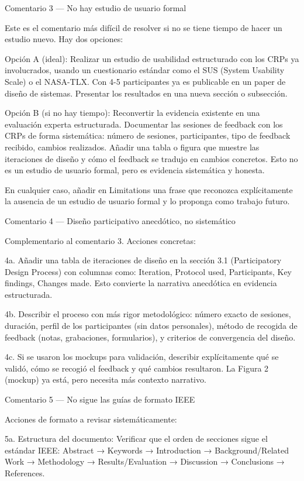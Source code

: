 Comentario 3 — No hay estudio de usuario formal

Este es el comentario más difícil de resolver si no se tiene tiempo de hacer un estudio nuevo. Hay dos opciones:

Opción A (ideal): Realizar un estudio de usabilidad estructurado con los CRPs ya involucrados, usando un cuestionario estándar como el SUS (System Usability Scale) o el NASA-TLX. Con 4-5 participantes ya es publicable en un paper de diseño de sistemas. Presentar los resultados en una nueva sección o subsección.

Opción B (si no hay tiempo): Reconvertir la evidencia existente en una evaluación experta estructurada. Documentar las sesiones de feedback con los CRPs de forma sistemática: número de sesiones, participantes, tipo de feedback recibido, cambios realizados. Añadir una tabla o figura que muestre las iteraciones de diseño y cómo el feedback se tradujo en cambios concretos. Esto no es un estudio de usuario formal, pero es evidencia sistemática y honesta.

En cualquier caso, añadir en Limitations una frase que reconozca explícitamente la ausencia de un estudio de usuario formal y lo proponga como trabajo futuro.

Comentario 4 — Diseño participativo anecdótico, no sistemático

Complementario al comentario 3. Acciones concretas:

4a. Añadir una tabla de iteraciones de diseño en la sección 3.1 (Participatory Design Process) con columnas como: Iteration, Protocol used, Participants, Key findings, Changes made. Esto convierte la narrativa anecdótica en evidencia estructurada.

4b. Describir el proceso con más rigor metodológico: número exacto de sesiones, duración, perfil de los participantes (sin datos personales), método de recogida de feedback (notas, grabaciones, formularios), y criterios de convergencia del diseño.

4c. Si se usaron los mockups para validación, describir explícitamente qué se validó, cómo se recogió el feedback y qué cambios resultaron. La Figura 2 (mockup) ya está, pero necesita más contexto narrativo.

Comentario 5 — No sigue las guías de formato IEEE

Acciones de formato a revisar sistemáticamente:

5a. Estructura del documento: Verificar que el orden de secciones sigue el estándar IEEE: Abstract → Keywords → Introduction → Background/Related Work → Methodology → Results/Evaluation → Discussion → Conclusions → References.

